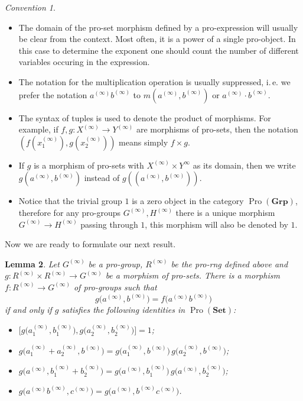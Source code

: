 \documentclass[oneside, 11pt]{amsart}
\numberwithin{equation}{section}
\newtheorem{lemma}{Lemma} \numberwithin{lemma}{section}
\theoremstyle{definition}
\theoremstyle{remark}
\newtheorem{conv}[lemma]{Convention} \Crefname{conv}{Convention}{Conventions}
\DeclareMathOperator{\Pro}{Pro}
\newcommand{\Set}{\mathbf{Set}}
\newcommand{\Group}{\mathbf{Grp}}
\begin{document}
\begin{conv}
\begin{itemize}
  \item The domain of the pro-set morphism defined by a pro-expression will usually be clear from the context. 
  Most often, it is a power of a single pro-object. In this case to determine the exponent one should count the number of different variables occuring in the expression.
  \item The notation for the multiplication operation is usually suppressed, i.\,e. we prefer the notation $a^{(\infty)} b^{(\infty)}$ to $m(a^{(\infty)}, b^{(\infty)})$ or $a^{(\infty)} \cdot b^{(\infty)}$.
  \item The syntax of tuples is used to denote the product of morphisms. For example, if $f,g \colon X^{(\infty)} \to Y^{(\infty)}$ are morphisms of pro-sets, then the notation $(f(x_1^{(\infty)}), g(x_2^{(\infty)}))$ means simply $f\times g$.
  \item If $g$ is a morphism of pro-sets with $X^{(\infty)} \times Y^{\infty}$ as its domain, then we write $g(a^{(\infty)}, b^{(\infty)})$ instead of $g((a^{(\infty)}, b^{(\infty)}))$.
  \item Notice that the trivial group $1$ is a zero object in the category $\Pro(\Group)$, therefore for any pro-groups $G^{(\infty)}, H^{(\infty)}$ there is a unique morphism $G^{(\infty)} \to H^{(\infty)}$ passing through $1$, this morphism will also be denoted by $1$.
 \end{itemize}
\end{conv} 
Now we are ready to formulate our next result.
\begin{lemma}\label{RingPresentation}
Let \(G^{(\infty)}\) be a pro-group, $R^{(\infty)}$ be the pro-rng defined above and \(g \colon R^{(\infty)} \times R^{(\infty)} \to G^{(\infty)}\) be a morphism of pro-sets. There is a morphism \(f \colon R^{(\infty)} \to G^{(\infty)}\) of pro-groups such that
\[g\bigl(a^{(\infty)} , b^{(\infty)}\bigr) = f\bigl(a^{(\infty)} b^{(\infty)}\bigr)\]
if and only if \(g\) satisfies the following identities in $\Pro(\Set)$:
\begin{itemize}
\item \(\bigl[g\bigl(a_1^{(\infty)}, b_1^{(\infty)}\bigr), g\bigl(a_2^{(\infty)}, b_2^{(\infty)}\bigr)\bigr] = 1\);
\item \(g\bigl(a_1^{(\infty)} + a_2^{(\infty)}, b^{(\infty)}\bigr) = g\bigl(a_1^{(\infty)}, b^{(\infty)}\bigr)\, g\bigl(a_2^{(\infty)}, b^{(\infty)}\bigr)\);
\item \(g\bigl(a^{(\infty)}, b_1^{(\infty)} + b_2^{(\infty)}\bigr) = g\bigl(a^{(\infty)}, b_1^{(\infty)}\bigr)\, g\bigl(a^{(\infty)}, b_2^{(\infty)}\bigr)\);
\item \(g\bigl(a^{(\infty)} b^{(\infty)}, c^{(\infty)}\bigr) = g\bigl(a^{(\infty)}, b^{(\infty)} c^{(\infty)}\bigr)\).
\end{itemize}
\end{lemma}
\end{document}
